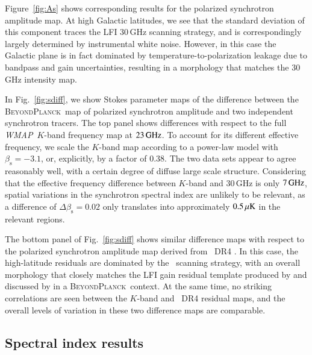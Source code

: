 \documentclass[twocolumn]{aa}
\def\WMAP{\textit{WMAP}}
\newcommand{\BP}{\textsc{BeyondPlanck}}
\newcommand{\?}[1]{\textcolor{red}{{\bf [#1]}}}
\begin{document}
Figure~\ref{fig:As} shows corresponding results for the polarized
synchrotron amplitude map. At high Galactic latitudes, we see that the
standard deviation of this component traces the LFI 30\,GHz scanning
strategy, and is correspondingly largely determined by instrumental
white noise. However, in this case the Galactic plane is in fact
dominated by temperature-to-polarization leakage due to bandpass and
gain uncertainties, resulting in a morphology that matches the 30\,GHz
intensity map. 



In Fig.~\ref{fig:sdiff}, we show Stokes parameter maps of the difference between
the \BP\ map of polarized synchrotron amplitude and two independent synchrotron
tracers. The top panel shows differences with respect to the full \WMAP\
$K$-band frequency map at $23\GHz$. To account for its different effective
frequency, we scale the $K$-band map according to a power-law model with
$\beta_{\mathrm s}=-3.1$, or, explicitly, by a factor of 0.38. The two data sets
appear to agree reasonably well, with a certain degree of diffuse large scale
structure. Considering that the effective frequency difference between
$K$-band and 30\,GHz is only $7\GHz$, spatial variations in the
synchrotron spectral index are unlikely to be relevant, as a
difference of $\Delta\beta_{\mathrm s}=0.02$ only translates into
approximately $0.5\muK$ in the relevant regions.

The bottom panel of Fig.~\ref{fig:sdiff} shows similar difference maps with
respect to the polarized synchrotron amplitude map derived from \Planck\ DR4
\citep{planck2020-LVII}. In this case, the high-latitude residuals are dominated
by the \Planck\ scanning strategy, with an overall morphology that closely
matches the LFI gain residual template produced by \citet{planck2016-l02} and
discussed by \citet{bp07} in a \BP\ context. At the same time, no striking
correlations are seen between the $K$-band and \Planck\ DR4 residual maps, and
the overall levels of variation in these two difference maps are comparable. 

\subsection{Spectral index results}
\end{document}
